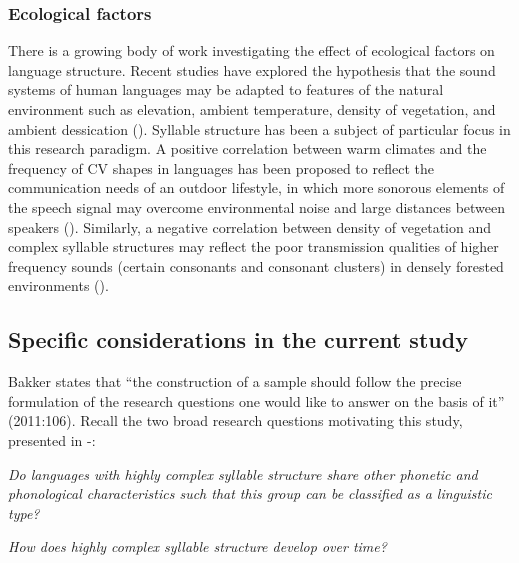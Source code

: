 \subsubsection{{Ecological} {factors}}\label{sec:2.1.2.3}

  There is a growing body of work investigating the effect of ecological factors on language structure. Recent studies have explored the hypothesis that the sound systems of human languages may be adapted to features of the natural environment such as elevation, ambient temperature, density of vegetation, and ambient dessication (\citealt{Everett2013,MaddiesonCoupé2015,EverettEtAl2016,Everett2017}). Syllable structure has been a subject of particular focus in this research paradigm. A positive correlation between warm climates and the frequency of CV shapes in languages has been proposed to reflect the communication needs of an outdoor lifestyle, in which more sonorous elements of the speech signal may overcome environmental noise and large distances between speakers (\citealt{MunroeEtAl1996,FoughtEtAl2004}). Similarly, a negative correlation between density of vegetation and complex syllable structures may reflect the poor transmission qualities of higher frequency sounds (certain consonants and consonant clusters) in densely forested environments (\citealt{MaddiesonCoupé2015}).

\subsection{Specific considerations in the current study}\label{sec:2.1.3}

  Bakker states that “the construction of a sample should follow the precise formulation of the research questions one would like to answer on the basis of it” (2011:106). Recall the two broad research questions motivating this study, presented in -:

\ea\label{ex:2.1}
   \textit{Do languages with highly complex syllable structure share other phonetic and phonological characteristics such that this group can be classified as a linguistic type?}
\z

\ea\label{ex:2.2}
   \textit{How does highly complex syllable structure develop over time?}
\z

